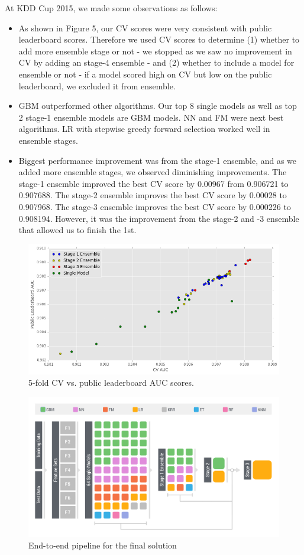 At KDD Cup 2015, we made some observations as follows:
\begin{itemize}
\setlength\itemsep{0em}
\item As shown in Figure 5, our CV scores were very consistent with public leaderboard scores.  Therefore we used CV scores to determine (1) whether to add more ensemble stage or not - we stopped as we saw no improvement in CV by adding an stage-4 ensemble - and (2) whether to include a model for ensemble or not - if a model scored high on CV but low on the public leaderboard, we excluded it from ensemble.
\item GBM outperformed other algorithms.  Our top 8 single models as well as top 2 stage-1 ensemble models are GBM models.  NN and FM were next best algorithms.  LR with stepwise greedy forward selection worked well in ensemble stages.
\item Biggest performance improvement was from the stage-1 ensemble, and as we added more ensemble stages, we observed diminishing improvements.  The stage-1 ensemble improved the best CV score by 0.00967 from 0.906721 to 0.907688.  The stage-2 ensemble improves the best CV score by 0.00028 to 0.907968.  The stage-3 ensemble improves the best CV score by 0.000226 to 0.908194.  However, it was the improvement from the stage-2 and -3 ensemble that allowed us to finish the 1st.
\end{itemize}

\begin{figure}[t]
  \centering
    \includegraphics[width=0.5 \textwidth]{cv_lb}
      \caption{5-fold CV vs. public leaderboard AUC scores.}
\end{figure}

\begin{figure}[!t]
  \centering
    \includegraphics[width=1 \textwidth]{ensemble}
      \caption{End-to-end pipeline for the final solution}
\end{figure}

